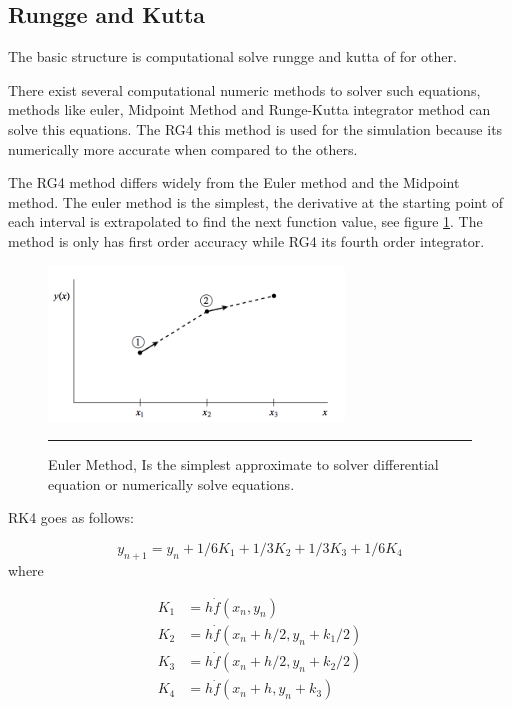 \subsection{Rungge and Kutta}


The basic structure is computational solve rungge and kutta of for other.

There exist several computational numeric methods to solver such equations, methods like euler, Midpoint Method and Runge-Kutta integrator method can solve this equations. The RG4 this method is used for the simulation because its numerically more accurate when compared to the others.

The RG4 method differs widely from the Euler method and the Midpoint method. The euler method is the simplest, the derivative at the starting point of each interval is extrapolated to find the next function value, see figure \ref{fig:euler}. The method is only has first order accuracy while RG4 its fourth order integrator.

\begin{figure}[htbp]
	\centering
		\includegraphics[width=0.7\textwidth]{Figures/euler.png}
		\rule{35em}{0.5pt}
	\caption[Euler Method]{Euler Method, Is the simplest approximate to solver differential equation or numerically solve equations.}
	\label{fig:euler}
\end{figure}

RK4 goes as follows:

\begin{equation} \label{eq:kg4}
y_{n+1} = y_{n} + 1/6 K_{1} + 1/3 K_{2} +1/3 K_{3} + 1/6 K_{4} 
\end{equation}
where

\begin{align*}
K_{1} &= h \dot f(x_{n}, y_{n}) \\
K_{2} &= h \dot f(x_{n} + h/2, y_{n} + k_{1}/2) \\
K_{3} &= h \dot f(x_{n} + h/2, y_{n} + k_{2}/2) \\
K_{4} &= h \dot f(x_{n} + h, y_{n} + k_{3})
\end{align*}

